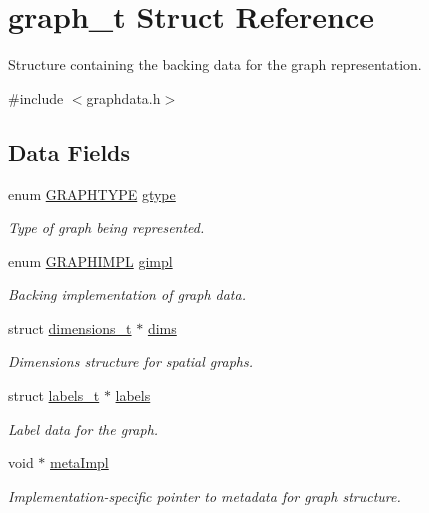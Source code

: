 \hypertarget{structgraph__t}{}\section{graph\+\_\+t Struct Reference}
\label{structgraph__t}


Structure containing the backing data for the graph representation.  




{\ttfamily \#include $<$graphdata.\+h$>$}

\subsection*{Data Fields}
\begin{DoxyCompactItemize}
\item 
enum \hyperlink{graphdata_8h_a384e88b524b782ff50439055cbc8a5c2}{G\+R\+A\+P\+H\+T\+Y\+PE} \hyperlink{structgraph__t_a602be255ab0523e0a5fe28436a29159a}{gtype}
\begin{DoxyCompactList}\small\item\em Type of graph being represented. \end{DoxyCompactList}\item 
enum \hyperlink{graphdata_8h_ad7f3a639f97221897a0429715dccefe6}{G\+R\+A\+P\+H\+I\+M\+PL} \hyperlink{structgraph__t_a220aff118ba6d13c927486099988c03d}{gimpl}
\begin{DoxyCompactList}\small\item\em Backing implementation of graph data. \end{DoxyCompactList}\item 
struct \hyperlink{structdimensions__t}{dimensions\+\_\+t} $\ast$ \hyperlink{structgraph__t_ad93f0c58ec1bb357b8d33def7259a1a3}{dims}
\begin{DoxyCompactList}\small\item\em Dimensions structure for spatial graphs. \end{DoxyCompactList}\item 
struct \hyperlink{structlabels__t}{labels\+\_\+t} $\ast$ \hyperlink{structgraph__t_ab0661b91402642806325cb4f4da9dc24}{labels}
\begin{DoxyCompactList}\small\item\em Label data for the graph. \end{DoxyCompactList}\item 
void $\ast$ \hyperlink{structgraph__t_ab11b23897ec5b39d38c3f85581bd313e}{meta\+Impl}
\begin{DoxyCompactList}\small\item\em Implementation-\/specific pointer to metadata for graph structure. \end{DoxyCompactList}\item 

\end{DoxyCompactItemize}
